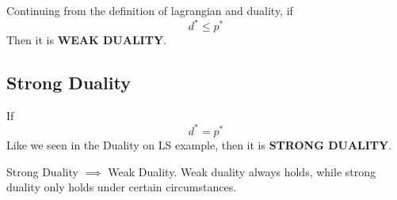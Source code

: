 \begin{definition}
	Continuing from the definition of lagrangian and duality, if
	\[
d^*\le p^*
	\]
	Then it is \textbf{WEAK DUALITY}.
\end{definition}


\subsection{Strong Duality} %
\label{sub:strong_duality}

\begin{definition}
	If
	\[
d^*= p^*
	\]
	Like we seen in the Duality on LS example, then it is \textbf{STRONG DUALITY}.
\end{definition}

\begin{remark}
	Strong Duality $\implies$ Weak Duality. Weak duality always holds, while strong duality only holds under certain circumstances.
\end{remark}


